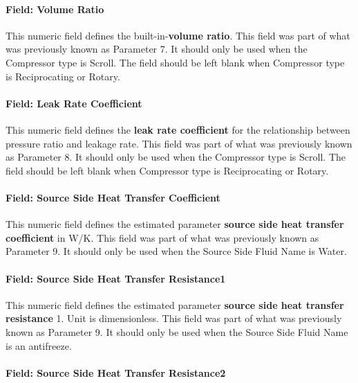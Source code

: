 \paragraph{Field: Volume Ratio}\label{field-volume-ratio}

This numeric field defines the built-in-\textbf{volume ratio}. This field was part of what was previously known as Parameter 7. It should only be used when the Compressor type is Scroll. The field should be left blank when Compressor type is Reciprocating or Rotary.

\paragraph{Field: Leak Rate Coefficient}\label{field-leak-rate-coefficient}

This numeric field defines the \textbf{leak rate coefficient} for the relationship between pressure ratio and leakage rate. This field was part of what was previously known as Parameter 8. It should only be used when the Compressor type is Scroll. The field should be left blank when Compressor type is Reciprocating or Rotary.

\paragraph{Field: Source Side Heat Transfer Coefficient}\label{field-source-side-heat-transfer-coefficient}

This numeric field defines the estimated parameter \textbf{source side heat transfer coefficient} in W/K. This field was part of what was previously known as Parameter 9. It should only be used when the Source Side Fluid Name is Water.

\paragraph{Field: Source Side Heat Transfer Resistance1}\label{field-source-side-heat-transfer-resistance1}

This numeric field defines the estimated parameter \textbf{source side heat transfer resistance} 1. Unit is dimensionless. This field was part of what was previously known as Parameter 9. It should only be used when the Source Side Fluid Name is an antifreeze.

\paragraph{Field: Source Side Heat Transfer Resistance2}\label{field-source-side-heat-transfer-resistance2}

